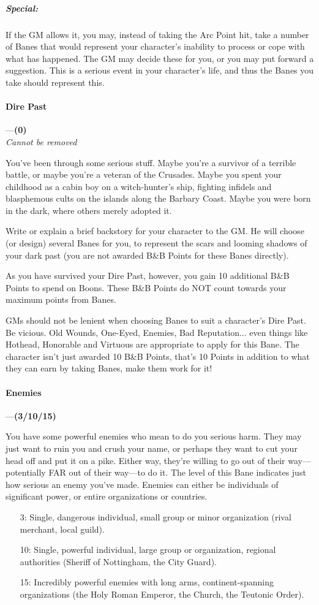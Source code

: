 \documentclass[oneside,11pt,english]{book}
\begin{document}
\subparagraph{Special:} If the GM allows it, you may, instead of taking the Arc
Point hit, take a number of Banes that would represent your character’s
inability to process or cope with what has happened. The GM may decide these for
you, or you may put forward a suggestion. This is a serious event in your
character’s life, and thus the Banes you take should represent this. 
\paragraph{\label{bane:Dire Past}Dire Past}---\quad\textbf{(0) }\\
\emph{Cannot be removed}\par
You've been through some serious stuff. Maybe you're a survivor of a terrible
battle, or maybe you're a veteran of the Crusades. Maybe you spent your
childhood as a cabin boy on a witch-hunter's ship, fighting infidels and
blasphemous cults on the islands along the Barbary Coast. Maybe you were born in
the dark, where others merely adopted it. 


Write or explain a brief backstory for your character to the GM. He will choose (or design) several Banes 
for you, to represent the scars and looming shadows of your dark past (you are not awarded B\&B Points 
for these Banes directly).


As you have survived your Dire Past, however, you gain 10 additional B\&B Points to spend on Boons. 
These B\&B Points do NOT count towards your maximum points from Banes. 


GMs should not be lenient when choosing Banes to suit a character’s Dire Past. Be vicious. Old Wounds, 
One-Eyed, Enemies, Bad Reputation... even things like Hothead, Honorable and Virtuous are appropriate 
to apply for this Bane. The character isn’t just awarded 10 B\&B Points, that’s 10 Points in addition to what they can earn by taking Banes, make them work for it! 
\paragraph{\label{bane:Enemies}Enemies}---\quad\textbf{(3/10/15) }\par
You have some powerful enemies who mean to do you serious harm. They may just want to ruin you and 
crush your name, or perhaps they want to cut your head off and put it on a pike. Either way, they're 
willing to go out of their way—potentially FAR out of their way—to do it. The level of this Bane 
indicates just how serious an enemy you've made. Enemies can either be individuals of significant power, or entire organizations or countries. 
\begin{itemize}
\item [3:] Single, dangerous individual, small group or minor organization (rival merchant, local guild). 
\item [10:] Single, powerful individual, large group or organization, regional authorities (Sheriff of Nottingham, the City Guard).
\item [15:] Incredibly powerful enemies with long arms, continent-spanning organizations (the Holy Roman Emperor, the Church, the Teutonic Order).
\end{itemize}
\end{document}
